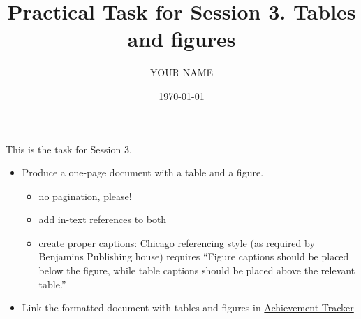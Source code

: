 \documentclass[a4paper,11pt]{article}
\title{Practical Task for Session 3. Tables and figures}
\author{YOUR NAME}
\date{\today}
\begin{document}
This is the task for Session 3. 
		\begin{itemize}
		\item Produce a one-page document with a table and a figure. 
		\begin{itemize}
			\item no pagination, please!
			\item add in-text references to both
			\item create proper captions: Chicago referencing style (as required by Benjamins Publishing house) requires ``Figure captions should be placed below the figure, while table captions should be placed above the relevant table.'' 
		\end{itemize} 
		\item Link the formatted document with tables and figures in  \href{https://docs.google.com/document/d/17ZBAQGBKIlO6JMwxz3LlghYq1sdsUjhHVXga46BK0kg/edit?usp=sharing}{Achievement Tracker}
	\end{itemize}
	
\end{document}
